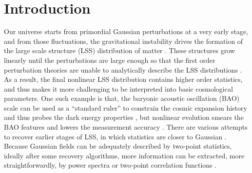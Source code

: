 \documentclass[aps,prd,twocolumn,superscriptaddress,amsfont,amssymb,amsmath,nofootinbib,showpacs,balancelastpage]{revtex4-1}
\begin{document}
\section{Introduction}\label{sec.intro}
Our universe starts from primordial Gaussian perturbations at a very early stage, 
and from those fluctuations, the gravitational instability drives the formation of 
the large scale structure (LSS) distribution of matter
\citep{1970A&A.....5...84Z,1985ApJ...292..371D}.
These structures grow 
linearly until the perturbations are large enough so that the first order 
perturbation theories are unable to analytically describe the LSS distributions 
\citep{2016JCAP...01..043M}. 
As a result, the final nonlinear LSS distribution contains higher order 
statistics, and thus makes it more challenging to be interpreted into basic
cosmological parameters. One such example is that, the baryonic acoustic oscillation (BAO)
scale can be used as a ``standard ruler'' to constrain the cosmic expansion history
and thus probes the dark energy properties \citep{2005NewAR..49..360E}, but
nonlinear evolution smears the BAO features and lowers the measurement
accuracy \citep{2005ApJ...633..560E,2012MNRAS.419.2949N}.
There are various attempts to recover earlier stages
of LSS, in which statistics are closer to Gaussian 
\citep{1992MNRAS.254..315W,2013MNRAS.436..759H}.
Because Gaussian fields can be adequately described by two-point statistics,
ideally after some recovery algorithms, more information can be extracted,
more straightforwardly, by power spectra or two-point correlation functions
\citep{2005MNRAS.360L..82R,2012MNRAS.421..832Y}.
\end{document}
